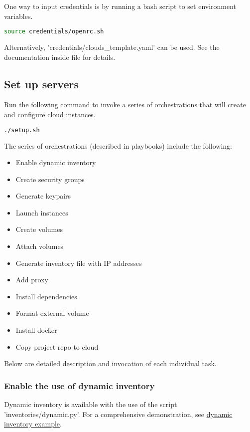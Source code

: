 One way to input credentials is by running a bash script to set environment variables.  
\begin{lstlisting}[language=bash]
source credentials/openrc.sh
\end{lstlisting}

Alternatively, 'credentials/clouds\_template.yaml' can be used. See the documentation inside file for details.  

\subsection{Set up servers}
Run the following command to invoke a series of orchestrations that will create and configure cloud instances.  
\begin{lstlisting}[language=bash]
./setup.sh
\end{lstlisting}

The series of orchestrations (described in playbooks) include the following:  
\begin{itemize}
  \item Enable dynamic inventory  
  \item Create security groups  
  \item Generate keypairs  
  \item Launch instances  
  \item Create volumes  
  \item Attach volumes  
  \item Generate inventory file with IP addresses  
  \item Add proxy
  \item Install dependencies
  \item Format external volume
  \item Install docker
  \item Copy project repo to cloud
\end{itemize}

Below are detailed description and invocation of each individual task.  

\subsubsection{Enable the use of dynamic inventory}
Dynamic inventory is available with the use of the script 'inventories/dynamic.py'. For a comprehensive demonstration,
see \href{https://docs.ansible.com/ansible/latest/user_guide/intro_dynamic_inventory.html#inventory-script-example-openstack}{dynamic inventory example}.  

